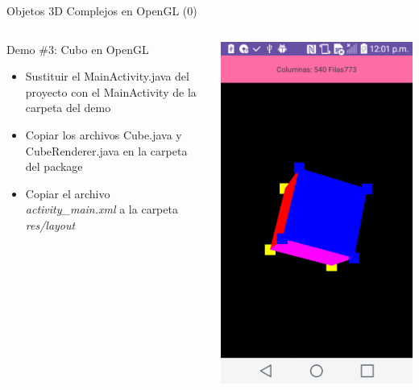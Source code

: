 \documentclass[aspectratio=169,compress]{beamer}
\begin{document}
\begin{frame}{Objetos 3D Complejos en OpenGL (0)}
\begin{columns}
\begin{column}{0.7\textwidth}
\begin{block}{Demo \#3: Cubo en OpenGL}
\begin{itemize}
\item Sustituir el MainActivity.java del proyecto con el MainActivity de la carpeta del demo
\item Copiar los archivos Cube.java y CubeRenderer.java en la carpeta del package
\item Copiar el archivo \textit{activity\_main.xml} a la carpeta \textit{res/layout}
\end{itemize}
\end{block}
\end{column}
\begin{column}{0.3\textwidth}
\begin{center}
\includegraphics[width=1.0\linewidth]{PantallazosDemoTaller/Demo3.png}

\end{center}
\end{column}
\end{columns}
\end{frame}
\end{document}
